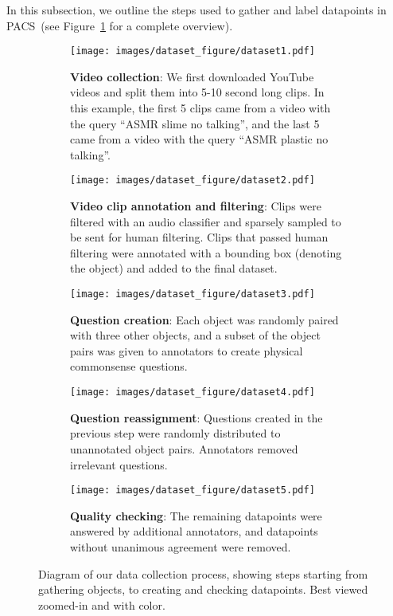 \documentclass[runningheads]{llncs}
\newcommand{\names}{\textsc{PACS}}
\begin{document}
In this subsection, we outline the steps used to gather and label datapoints in \names\ (see Figure~\ref{fig:dataset_pipeline} for a complete overview).

\begin{figure}[t!]
\begin{framed}
    \centering
\begin{subfigure}{\textwidth}
        \centering
        \caption{\textbf{Video collection}: We first downloaded YouTube videos and split them into 5-10 second long clips. In this example, the first 5 clips came from a video with the query ``ASMR slime no talking'', and the last 5 came from a video with the query ``ASMR plastic no talking''.}
\texttt{[image: images/dataset\_figure/dataset1.pdf]}
    \end{subfigure} 
    \begin{subfigure}{\textwidth}
        \centering
        \caption{\textbf{Video clip annotation and filtering}: Clips were filtered with an audio classifier and sparsely sampled to be sent for human filtering. Clips that passed human filtering were annotated with a bounding box (denoting the object) and added to the final dataset.} 
\texttt{[image: images/dataset\_figure/dataset2.pdf]}
\end{subfigure}
    \begin{subfigure}{\textwidth}
        \centering
        \caption{\textbf{Question creation}: Each object was randomly paired with three other objects, and a subset of the object pairs was given to annotators to create physical commonsense questions.} 
\texttt{[image: images/dataset\_figure/dataset3.pdf]}
\end{subfigure}
    \begin{subfigure}[b]{0.48\textwidth}
        \centering
        \caption{\textbf{Question reassignment}: Questions created in the previous step were randomly distributed to unannotated object pairs. Annotators removed irrelevant questions.}
\texttt{[image: images/dataset\_figure/dataset4.pdf]}
    \end{subfigure}
    \hfill
    \begin{subfigure}[b]{0.48\textwidth}
        \centering
        \caption{\textbf{Quality checking}: The remaining datapoints were answered by additional annotators, and datapoints without unanimous agreement were removed. } 
\texttt{[image: images/dataset\_figure/dataset5.pdf]}
    \end{subfigure}
\end{framed}
\caption{Diagram of our data collection process, showing steps starting from gathering objects, to creating and checking datapoints. Best viewed zoomed-in and with color.}
\label{fig:dataset_pipeline}
\end{figure}
\end{document}
